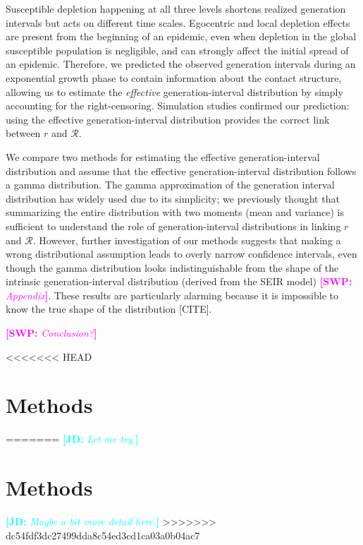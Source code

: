 \documentclass[12pt]{article}
\newcommand{\RR}{\ensuremath{{\mathcal R}}}
\newcommand{\comment}[3]{\textcolor{#1}{\textbf{[#2: }\textsl{#3}\textbf{]}}}
\newcommand{\jd}[1]{\comment{cyan}{JD}{#1}}
\newcommand{\swp}[1]{\comment{magenta}{SWP}{#1}}
\begin{document}
Susceptible depletion happening at all three levels shortens realized generation intervals but acts on different time scales.
Egocentric and local depletion effects are present from the beginning of an epidemic, even when depletion in the global susceptible population is negligible, and can strongly affect the initial spread of an epidemic.
Therefore, we predicted the observed generation intervals during an exponential growth phase to contain information about the contact structure, allowing us to estimate the \emph{effective} generation-interval distribution by simply accounting for the right-censoring.
Simulation studies confirmed our prediction: using the effective generation-interval distribution provides the correct link between $r$ and $\RR$.

We compare two methods for estimating the effective generation-interval distribution and assume that the effective generation-interval distribution follows a gamma distribution.
The gamma approximation of the generation interval distribution has widely used due to its simplicity;
we previously thought that summarizing the entire distribution with two moments (mean and variance) is sufficient to understand the role of generation-interval distributions in linking $r$ and $\RR$.
However, further investigation of our methods suggests that making a wrong distributional assumption leads to overly narrow confidence intervals, even though the gamma distribution looks indistinguishable from the shape of the intrinsic generation-interval distribution (derived from the SEIR model) \swp{Appendix}.
These results are particularly alarming because it is impossible to know the true shape of the distribution [CITE].

\swp{Conclusion?}

<<<<<<< HEAD
\section{Methods}


=======
\jd{Let me try.}

\section{Methods}

\jd{Maybe a bit more detail here.}
>>>>>>> dc54fdf3dc27499dda8c54ed3cd1ca03a0b04ac7


\end{document}
